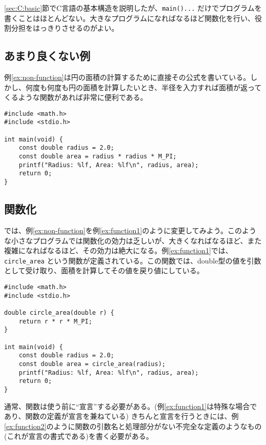 \ref{sec:C:basic}節でC言語の基本構造を説明したが、\texttt{main(){...}} だけでプログラムを書くことはほとんどない。大きなプログラムになればなるほど関数化を行い、役割分担をはっきりさせるのがよい。

\subsection{あまり良くない例}
例\ref{ex:non-function}は円の面積の計算するために直接その公式を書いている。しかし、何度も何度も円の面積を計算したいとき、半径を入力すれば面積が返ってくるような関数があれば非常に便利である。
\begin{reidai}\label{ex:non-function}
    \begin{verbatim}
#include <math.h>
#include <stdio.h>

int main(void) {
    const double radius = 2.0;
    const double area = radius * radius * M_PI;
    printf("Radius: %lf, Area: %lf\n", radius, area);
    return 0;
}
\end{verbatim}
\end{reidai}

\subsection{関数化}
では、例\ref{ex:non-function}を例\ref{ex:function1}のように変更してみよう。このような小さなプログラムでは関数化の効力は乏しいが、大きくなればなるほど、また複雑になればなるほど、その効力は絶大になる。例\ref{ex:function1}では、\texttt{circle\_area} という関数が定義されている。この関数では、double型の値を引数として受け取り、面積を計算してその値を戻り値にしている。

\begin{reidai}\label{ex:function1}
    \begin{verbatim}
#include <math.h>
#include <stdio.h>

double circle_area(double r) {
    return r * r * M_PI;
}

int main(void) {
    const double radius = 2.0;
    const double area = circle_area(radius);
    printf("Radius: %lf, Area: %lf\n", radius, area);
    return 0;
}
\end{verbatim}
\end{reidai}

通常、関数は使う前に``宣言''する必要がある。(例\ref{ex:function1}は特殊な場合であり、関数の定義が宣言を兼ねている)
きちんと宣言を行うときには、例\ref{ex:function2}のように関数の引数名と処理部分がない不完全な定義のようなもの(これが宣言の書式である)を書く必要がある。

